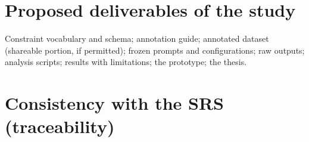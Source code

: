 \documentclass[
  11pt,a4paper,oneside]{report}
\begin{document}
\hypertarget{proposed-deliverables-of-the-study}{%
\section{Proposed deliverables of the
study}\label{proposed-deliverables-of-the-study}}

Constraint vocabulary and schema; annotation guide; annotated dataset
(shareable portion, if permitted); frozen prompts and configurations;
raw outputs; analysis scripts; results with limitations; the prototype;
the thesis.

\hypertarget{consistency-with-the-srs-traceability}{%
\section{Consistency with the SRS
(traceability)}\label{consistency-with-the-srs-traceability}}
\end{document}
